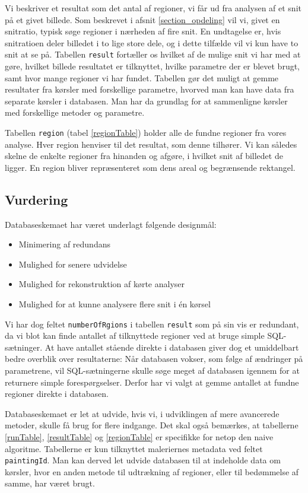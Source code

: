 {Vi beskriver et resultat som det antal af regioner, vi får ud fra
analysen af et snit på et givet billede. Som beskrevet i afsnit
\ref{section_opdeling} vil vi, givet en snitratio, typisk søge regioner
i nærheden af fire snit. En undtagelse er, hvis snitratioen deler
billedet i to lige store dele, og i dette tilfælde vil vi kun have to
snit at se på. Tabellen \texttt{result} fortæller os hvilket af de
mulige snit vi har med at gøre, hvilket billede resultatet er
tilknyttet, hvilke parametre der er blevet brugt, samt hvor mange
regioner vi har fundet. Tabellen gør det muligt at gemme resultater fra
kørsler med forskellige parametre, hvorved man kan have data fra
separate kørsler i databasen. Man har da grundlag for at sammenligne
kørsler med forskellige metoder og parametre.

Tabellen \texttt{region} (tabel \ref{regionTable}) holder alle de fundne
regioner fra vores analyse. Hver region henviser til det resultat, som
denne tilhører. Vi kan således skelne de enkelte regioner fra hinanden
og afgøre, i hvilket snit af billedet de ligger. En region bliver
repræsenteret som dens areal og begrænsende rektangel.

\subsection{Vurdering}
Databaseskemaet har været underlagt følgende designmål:

\begin{itemize}
    \item Minimering af redundans
    \item Mulighed for senere udvidelse
    \item Mulighed for rekonstruktion af kørte analyser
    \item Mulighed for at kunne analysere flere snit i én kørsel
\end{itemize}

Vi har dog feltet \texttt{numberOfRgions} i tabellen \texttt{result} som
på sin vis er redundant, da vi blot kan finde antallet af tilknyttede
regioner ved at bruge simple SQL-sætninger. At have antallet stående
direkte i databasen giver dog et umiddelbart bedre overblik over
resultaterne: Når databasen vokser, som følge af ændringer på
parametrene, vil SQL-sætningerne skulle søge meget af databasen igennem
for at returnere simple forespørgselser. Derfor har vi valgt at gemme
antallet at fundne regioner direkte i databasen.

Databaseskemaet er let at udvide, hvis vi, i udviklingen af mere
avancerede metoder, skulle få brug for flere indgange. Det skal også
bemærkes, at tabellerne \ref{runTable}, \ref{resultTable} og
\ref{regionTable} er specifikke for netop den naive algoritme.
Tabellerne er kun tilknyttet maleriernes metadata ved feltet
\texttt{paintingId}. Man kan derved let udvide databasen til at
indeholde data om kørsler, hvor en anden metode til udtrækning af
regioner, eller til bedømmelse af samme, har været brugt.

}

